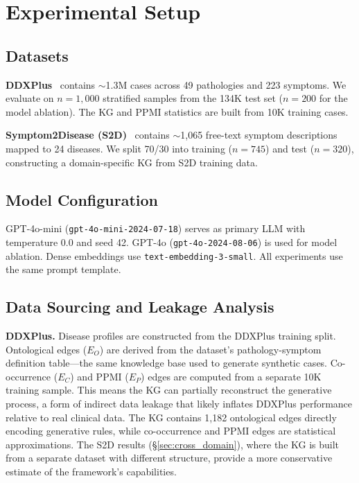 \documentclass[runningheads]{llncs}
\begin{document}
\section{Experimental Setup}
\label{sec:experiments}

\subsection{Datasets}

\textbf{DDXPlus}~\cite{fansi2022ddxplus} contains ${\sim}$1.3M cases across 49 pathologies and 223 symptoms. We evaluate on $n{=}1{,}000$ stratified samples from the 134K test set ($n{=}200$ for the model ablation). The KG and PPMI statistics are built from 10K training cases.

\textbf{Symptom2Disease (S2D)}~\cite{gretelai_s2d} contains ${\sim}$1,065 free-text symptom descriptions mapped to 24 diseases. We split 70/30 into training ($n{=}745$) and test ($n{=}320$), constructing a domain-specific KG from S2D training data.

\subsection{Model Configuration}

GPT-4o-mini (\texttt{gpt-4o-mini-2024-07-18}) serves as primary LLM with temperature 0.0 and seed 42. GPT-4o (\texttt{gpt-4o-2024-08-06}) is used for model ablation. Dense embeddings use \texttt{text-embedding-3-small}. All experiments use the same prompt template.

\subsection{Data Sourcing and Leakage Analysis}
\label{sec:data_sourcing}

\textbf{DDXPlus.} Disease profiles are constructed from the DDXPlus training split. Ontological edges ($E_O$) are derived from the dataset's pathology-symptom definition table---the same knowledge base used to generate synthetic cases. Co-occurrence ($E_C$) and PPMI ($E_P$) edges are computed from a separate 10K training sample. This means the KG can partially reconstruct the generative process, a form of indirect data leakage that likely inflates DDXPlus performance relative to real clinical data. The KG contains 1,182 ontological edges directly encoding generative rules, while co-occurrence and PPMI edges are statistical approximations. The S2D results (\S\ref{sec:cross_domain}), where the KG is built from a separate dataset with different structure, provide a more conservative estimate of the framework's capabilities.
\end{document}
